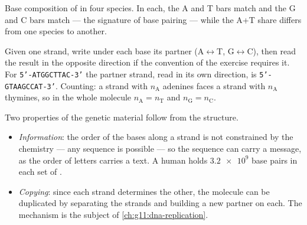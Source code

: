 \begin{omfigure}

{\small Base composition of  in four species. In each, the A and T
bars match and the G and C bars match --- the signature of base
pairing --- while the A+T share differs from one species to another.}
\end{omfigure}

\begin{method}\label{met:g10:universal-dna:complement}
Given one strand, write under each base its partner (A$\leftrightarrow$T,
G$\leftrightarrow$C), then read the result in the opposite direction
if the convention of the exercise requires it. For
\texttt{5'-ATGGCTTAC-3'} the partner strand, read in its own
direction, is \texttt{5'-GTAAGCCAT-3'}. Counting: a strand with
$n_\mathrm{A}$ adenines faces a strand with $n_\mathrm{A}$ thymines,
so in the whole molecule $n_\mathrm{A} = n_\mathrm{T}$ and
$n_\mathrm{G} = n_\mathrm{C}$.
\end{method}

\begin{proposition}\label{prop:g10:universal-dna:explains}
Two properties of the genetic material follow from the structure.
\begin{itemize}
  \item \emph{Information}: the order of the bases along a strand is
        not constrained by the chemistry --- any sequence is possible
        --- so the sequence can carry a message, as the order of
        letters carries a text. A human  holds $\num{3.2e9}$ base
        pairs in each set of .
  \item \emph{Copying}: since each strand determines the other, the
        molecule can be duplicated by separating the strands and
        building a new partner on each. The mechanism is the subject of
        \cref{ch:g11:dna-replication}.
\end{itemize}
\end{proposition}
\admitted

